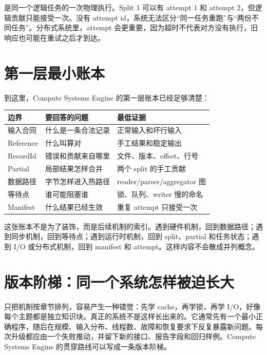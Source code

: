  是同一个逻辑任务的一次物理执行。Split 1 可以有 attempt 1 和 attempt 2，但逻辑贡献只能接受一次。没有 attempt id，系统无法区分“同一任务重跑”与“两份不同任务”。分布式系统里，attempt 会更重要，因为超时不代表对方没有执行，旧响应也可能在重试之后才到达。

\section{第一层最小账本}

到这里，Compute Systems Engine 的第一层账本已经足够清楚：

\begin{center}
\begin{tabular}{lll}
\toprule
边界 & 要回答的问题 & 最低证据 \\
\midrule
输入合同 & 什么是一条合法记录 & 正常输入和坏行输入 \\
Reference & 什么叫算对 & 手工结果和稳定输出 \\
RecordId & 错误和贡献来自哪里 & 文件、版本、offset、行号 \\
Partial & 局部结果怎样合并 & 两个 split 的手工贡献 \\
数据路径 & 字节怎样进入热路径 & reader/parser/aggregator 图 \\
等待点 & 谁可能阻塞谁 & 锁、队列、writer 慢的命名 \\
Manifest & 什么结果已经生效 & 重复 attempt 只接受一次 \\
\bottomrule
\end{tabular}
\end{center}

这张账本不是为了装饰，而是后续机制的索引。遇到硬件机制，回到数据路径；遇到同步机制，回到等待点；遇到运行时机制，回到 split、partial 和任务状态；遇到 I/O 或分布式机制，回到 manifest 和 attempt。这样内容不会散成并列概念。

\section{版本阶梯：同一个系统怎样被迫长大}

只把机制按章节排列，容易产生一种错觉：先学 cache，再学锁，再学 I/O，好像每个主题都是独立知识块。真正的系统不是这样长出来的。它通常先有一个最小正确程序，随后在规模、输入分布、线程数、故障和恢复要求下反复暴露新问题。每次升级都应由一个失败推动，并留下新的接口、报告字段和回归样例。Compute Systems Engine 的贯穿路线可以写成一条版本阶梯。

